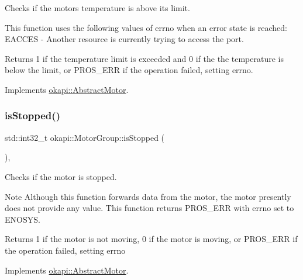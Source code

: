 Checks if the motor\textquotesingle{}s temperature is above its limit.

This function uses the following values of errno when an error state is reached\+: E\+A\+C\+C\+ES -\/ Another resource is currently trying to access the port.

\begin{DoxyReturn}{Returns}
1 if the temperature limit is exceeded and 0 if the the temperature is below the limit, or P\+R\+O\+S\+\_\+\+E\+RR if the operation failed, setting errno. 
\end{DoxyReturn}


Implements \mbox{\hyperlink{classokapi_1_1AbstractMotor_a61e24db43d1fe790b173cc0b4e27922f}{okapi\+::\+Abstract\+Motor}}.

\mbox{\label{classokapi_1_1MotorGroup_a50dfcb9272ad53aa231119a523ad2f2e}} 
\subsubsection{\texorpdfstring{isStopped()}{isStopped()}}
{\footnotesize\ttfamily std\+::int32\+\_\+t okapi\+::\+Motor\+Group\+::is\+Stopped (\begin{DoxyParamCaption}{ }\end{DoxyParamCaption})\hspace{0.3cm}{\ttfamily [override]}, {\ttfamily [virtual]}}

Checks if the motor is stopped.

\begin{DoxyNote}{Note}
Although this function forwards data from the motor, the motor presently does not provide any value. This function returns P\+R\+O\+S\+\_\+\+E\+RR with errno set to E\+N\+O\+S\+YS.
\end{DoxyNote}
\begin{DoxyReturn}{Returns}
1 if the motor is not moving, 0 if the motor is moving, or P\+R\+O\+S\+\_\+\+E\+RR if the operation failed, setting errno 
\end{DoxyReturn}


Implements \mbox{\hyperlink{classokapi_1_1AbstractMotor_aa46c96a6eec7921ad5b12fcd4119358e}{okapi\+::\+Abstract\+Motor}}.

\mbox{\label{classokapi_1_1MotorGroup_a616f20db24f1eff4d3641b86faef4fbd}} 
